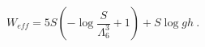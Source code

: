 \begin{equation}
W_{eff}=5S\left(-\log{\frac{S}{\Lambda_6^3}}+1 \right)+S\log{gh} ~.
\end{equation}

